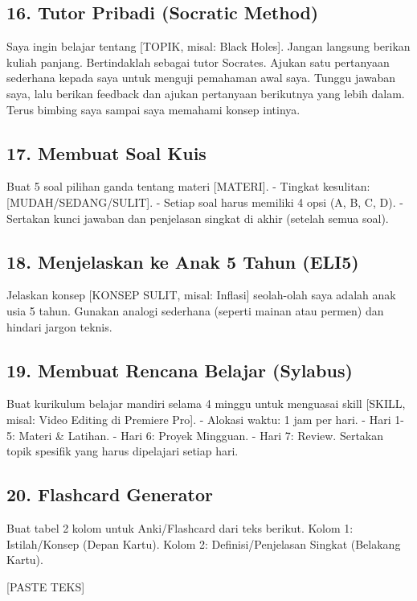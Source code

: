 \subsection{16. Tutor Pribadi (Socratic Method)}
\begin{promptbox}
Saya ingin belajar tentang [TOPIK, misal: Black Holes].
Jangan langsung berikan kuliah panjang. Bertindaklah sebagai tutor Socrates.
Ajukan satu pertanyaan sederhana kepada saya untuk menguji pemahaman awal saya.
Tunggu jawaban saya, lalu berikan feedback dan ajukan pertanyaan berikutnya yang lebih dalam. Terus bimbing saya sampai saya memahami konsep intinya.
\end{promptbox}

\subsection{17. Membuat Soal Kuis}
\begin{promptbox}
Buat 5 soal pilihan ganda tentang materi [MATERI].
- Tingkat kesulitan: [MUDAH/SEDANG/SULIT].
- Setiap soal harus memiliki 4 opsi (A, B, C, D).
- Sertakan kunci jawaban dan penjelasan singkat di akhir (setelah semua soal).
\end{promptbox}

\subsection{18. Menjelaskan ke Anak 5 Tahun (ELI5)}
\begin{promptbox}
Jelaskan konsep [KONSEP SULIT, misal: Inflasi] seolah-olah saya adalah anak usia 5 tahun. Gunakan analogi sederhana (seperti mainan atau permen) dan hindari jargon teknis.
\end{promptbox}

\subsection{19. Membuat Rencana Belajar (Sylabus)}
\begin{promptbox}
Buat kurikulum belajar mandiri selama 4 minggu untuk menguasai skill [SKILL, misal: Video Editing di Premiere Pro].
- Alokasi waktu: 1 jam per hari.
- Hari 1-5: Materi & Latihan.
- Hari 6: Proyek Mingguan.
- Hari 7: Review.
Sertakan topik spesifik yang harus dipelajari setiap hari.
\end{promptbox}

\subsection{20. Flashcard Generator}
\begin{promptbox}
Buat tabel 2 kolom untuk Anki/Flashcard dari teks berikut.
Kolom 1: Istilah/Konsep (Depan Kartu).
Kolom 2: Definisi/Penjelasan Singkat (Belakang Kartu).

[PASTE TEKS]
\end{promptbox}

